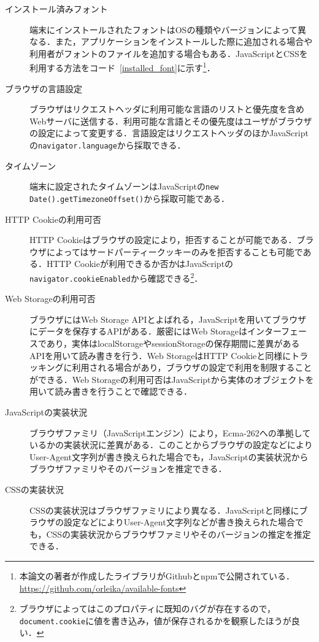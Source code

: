 \begin{description}
  \item[インストール済みフォント]端末にインストールされたフォントはOSの種類やバージョンによって異なる．また，アプリケーションをインストールした際に追加される場合や利用者がフォントのファイルを追加する場合もある．JavaScriptとCSSを利用する方法をコード~\ref{installed_font}に示す\footnote{本論文の著者が作成したライブラリがGithubとnpmで公開されている．\url{https://github.com/orleika/available-fonts}}．



\item[ブラウザの言語設定]ブラウザはリクエストヘッダに利用可能な言語のリストと優先度を含めWebサーバに送信する．利用可能な言語とその優先度はユーザがブラウザの設定によって変更する．言語設定はリクエストヘッダのほかJavaScriptの\texttt{navigator.language}から採取できる．
\item[タイムゾーン]端末に設定されたタイムゾーンはJavaScriptの\texttt{new Date().getTimezoneOffset()}から採取可能である．
\item[HTTP Cookieの利用可否]HTTP Cookieはブラウザの設定により，拒否することが可能である．ブラウザによってはサードパーティークッキーのみを拒否することも可能である．HTTP Cookieが利用できるか否かはJavaScriptの\texttt{navigator.cookieEnabled}から確認できる\footnote{ブラウザによってはこのプロパティに既知のバグが存在するので，\texttt{document.cookie}に値を書き込み，値が保存されるかを観察したほうが良い．}．
\item[Web Storageの利用可否]ブラウザにはWeb Storage APIとよばれる，JavaScriptを用いてブラウザにデータを保存するAPIがある．厳密にはWeb Storageはインターフェースであり，実体はlocalStorageやsessionStorageの保存期間に差異があるAPIを用いて読み書きを行う．Web StorageはHTTP Cookieと同様にトラッキングに利用される場合があり，ブラウザの設定で利用を制限することができる．Web Storageの利用可否はJavaScriptから実体のオブジェクトを用いて読み書きを行うことで確認できる．
\item[JavaScriptの実装状況]ブラウザファミリ（JavaScriptエンジン）により，Ecma-262への準拠しているかの実装状況に差異がある．このことからブラウザの設定などによりUser-Agent文字列が書き換えられた場合でも，JavaScriptの実装状況からブラウザファミリやそのバージョンを推定できる．
\item[CSSの実装状況]CSSの実装状況はブラウザファミリにより異なる．JavaScriptと同様にブラウザの設定などによりUser-Agent文字列などが書き換えられた場合でも，CSSの実装状況からブラウザファミリやそのバージョンの推定を推定できる．

\end{description}
